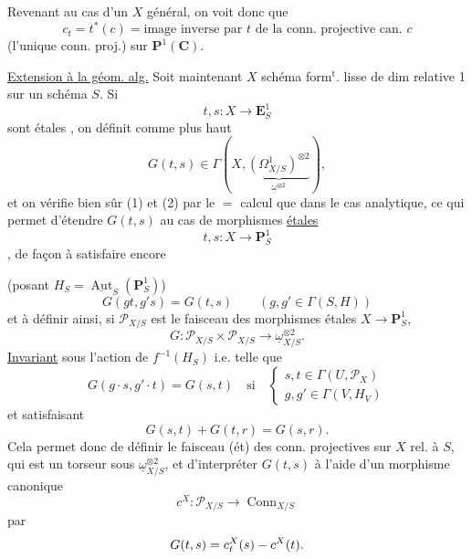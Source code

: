 Revenant au cas d'un $X$ général, on voit donc que
\[
c_t=t^*(c)=\text{image inverse par }t\text{ de la conn. projective can. }c
\]
(l'unique conn. proj.) sur $\mathbf P^1(\mathbf C)$.

\uline{Extension à la géom. alg.} Soit maintenant $X$ schéma form$^{\mathrm t}$. lisse de dim  relative 1 sur un schéma $S$. Si 
\[
t,s:X\longrightarrow\mathbf E^1_S
\]
sont étales , on définit comme plus haut
\[
G(t,s)\in\Gamma(X,\underbrace{(\Omega^1_{X/S})^{\otimes2}}_{\underline\omega^{\otimes2}}),
\]
et on vérifie bien sûr (1) et (2) par le $=$ calcul que dans le cas analytique, ce qui permet d'étendre $G(t,s)$ au cas de morphismes \uline{étales}
\[
t,s:X\longrightarrow\mathbf P^1_S
\]
, de façon à satisfaire encore 

(posant $H_S=\underline{\operatorname{Aut}}_S(\mathbf P^1_S)$)
\[
G(gt,g's)=G(t,s)\qquad(g,g'\in\Gamma(S,H))
\]
et à définir ainsi, si $\mathcal P_{X/S}$ est le faisceau  des morphismes étales $X\longrightarrow\mathbf P^1_S$,  
\[
G:\mathcal P_{X/S}\times\mathcal P_{X/S}\longrightarrow\underline\omega_{X/S}^{\otimes2}.
\]
\uline{Invariant} sous l'action de $f^{-1}(H_S)$ i.e. telle que
\[
G(g\cdot s,g'\cdot t)=G(s,t)\quad\text{si}\quad
\left\{\begin{array}{l}s,t\in\Gamma(U,\mathcal P_X)\\g,g'\in\Gamma(V,H_V)\end{array}\right.
\]
et satisfaisant
\[
G(s,t)+G(t,r)=G(s,r).
\]
Cela permet donc de définir le faisceau  (ét) des conn. projectives sur $X$ rel. à $S$, qui est un torseur sous $\underline\omega_{X/S}^{\otimes2}$, et d'interpréter $G(t,s)$ à l'aide d'un morphisme canonique
\[
c^X:\mathcal P_{X/S}\longrightarrow\operatorname{Conn}_{X/S}
\]
par
\[
G(t,s)=c^X_{{t}}(s)-c^X(t).
\]

